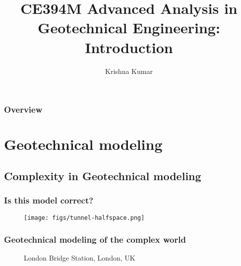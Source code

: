 \documentclass[notes]{beamer}
\title[CE394M: Intro to geotech analysis]{CE394M Advanced Analysis in Geotechnical Engineering: Introduction}
\author{Krishna Kumar} %
\institute[UT Austin] %
{
University of Texas at Austin \\
\medskip
\textit{
  \url{krishnak@utexas.edu}} %
}
\date{} %
\begin{document}
\begin{frame}
\titlepage %
\end{frame}

\begin{frame}
 \frametitle{Overview}
 \tableofcontents
\end{frame}


\section{Geotechnical modeling}

\subsection{Complexity in Geotechnical modeling}
\begin{frame}
	\frametitle{Is this model correct?}
	\begin{figure}
		\texttt{[image: figs/tunnel-halfspace.png]}
	\end{figure}
\end{frame}

\begin{frame}
\frametitle{Geotechnical modeling of the complex world}
\begin{figure}
	\caption*{London Bridge Station, London, UK}
\end{figure}
\end{frame}
\end{document}
